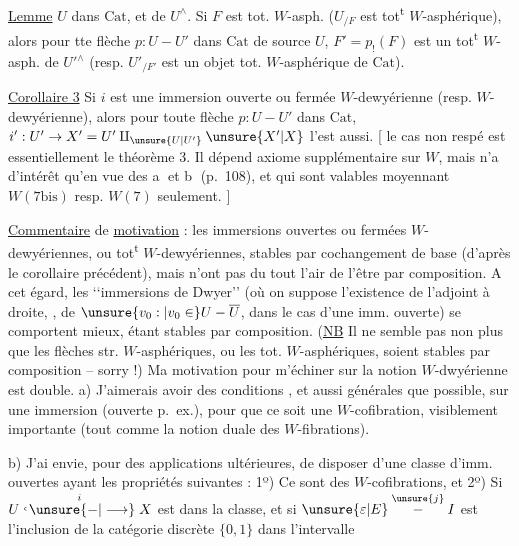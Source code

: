 \uline{Lemme}  $U$ dans $\mathrm{Cat}$, et  de $U^\wedge$. Si $F$ est tot. $W$-asph.  ($U_{/F}$ est tot\textsuperscript{t} $W$-asphérique), alors pour tte flèche $p:U-U'$ dans $\mathrm{Cat}$ de source $U$, $F'=p_!(F)$ est un  tot\textsuperscript{t} $W$-asph. de $U'{}^\wedge$ (resp.
$U'_{/F'}$ est un objet tot. $W$-asphérique de $\mathrm{Cat}$).

\uline{Corollaire 3}  Si $i$ est une immersion ouverte ou fermée $W$-dewyérienne (resp.  $W$-dewyérienne), alors pour toute flèche $p:U-U'$ dans $\mathrm{Cat}$, $i':U'\to X'=U'\amalg_{\unsure{U|U'}}\unsure{X'|X}$ l'est aussi. [ le cas non respé est essentiellement le théorème 3. Il  dépend  axiome supplémentaire sur $W$, mais n'a d'intérêt qu'en vue des  \textcircled{a} et \textcircled{b} (p.~108), et qui sont valables moyennant $W(7\mathrm{bis})$ resp. $W(7)$ seulement. ]

\uline{Commentaire} de \uline{motivation} : les immersions ouvertes ou fermées $W$-dewyériennes, ou  tot\textsuperscript{t} $W$-dewyériennes,   stables par cochangement de base (d'après le corollaire précédent), mais n'ont pas du tout l'air de l'être par composition. A cet égard, les \lq\lq immersions de Dwyer\rq\rq{} (où on suppose l'existence de l'adjoint à droite,  , de $\unsure{v_0:|v_0\in} U-\overline U$, dans le cas d'une imm. ouverte) se comportent mieux, étant stables par composition. (\uline{NB} Il ne semble pas
non plus  que les flèches str. $W$-asphériques, ou les tot. $W$-asphériques, soient stables par composition -- sorry !) Ma motivation pour m'échiner sur la notion $W$-dwyérienne est double. a) J'aimerais avoir des conditions  , et aussi générales que possible, sur une immersion (ouverte p.~ex.), pour que ce soit une $W$-cofibration,  visiblement importante (tout comme la notion duale des $W$-fibrations).

b) J'ai envie, pour des applications ultérieures, de disposer d'une classe d'imm. ouvertes ayant les propriétés suivantes : 1º) Ce sont des $W$-cofibrations, et 2º) Si $U\overset{i}{\lhook\joinrel\unsure{-|\longrightarrow}}X$ est dans la classe,  et si $\unsure{\varepsilon|E}\overset{\unsure{j}}{-}I$ est l'inclusion  de la catégorie discrète $\{0,1\}$ dans l'intervalle

